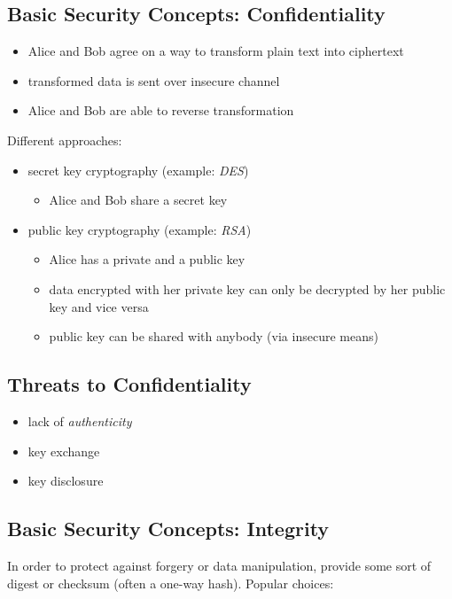 \documentclass[xga]{xdvislides}
\begin{document}
\subsection{Basic Security Concepts: Confidentiality}
\begin{itemize}
	\item Alice and Bob agree on a way to transform plain text into ciphertext
	\item transformed data is sent over insecure channel
	\item Alice and Bob are able to reverse transformation
\end{itemize}
\addvspace{.5in}
Different approaches:
\begin{itemize}
	\item secret key cryptography (example: {\em DES})
		\begin{itemize}
			\item Alice and Bob share a secret key
		\end{itemize}
\end{itemize}
\addvspace{.25in}
\begin{itemize}
	\item public key cryptography (example: {\em RSA})
		\begin{itemize}
			\item Alice has a private and a public key
			\item data encrypted with her private key can only be decrypted by
				her public key and vice versa
			\item public key can be shared with anybody (via insecure means)
		\end{itemize}
\end{itemize}

\subsection{Threats to Confidentiality}
\begin{itemize}
	\item lack of {\em authenticity}
	\item key exchange
	\item key disclosure
\end{itemize}

\subsection{Basic Security Concepts: Integrity}
In order to protect against forgery or data manipulation, provide some sort of
digest or checksum (often a one-way hash).  Popular choices:
\end{document}
